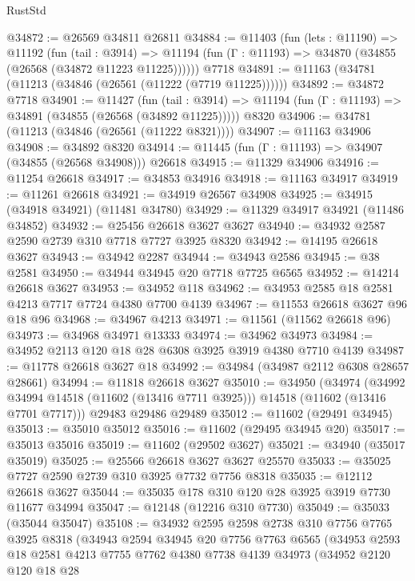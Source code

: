\begin{lexlean}{RustStd}
\begin{coremodule}
@34872 := @26569 @34811 @26811
@34884 := @11403
    (fun (lets : @11190) =>
    @11192
      (fun (tail : @3914) =>
      @11194 (fun (Γ : @11193) => @34870 (@34855 (@26568 (@34872 @11223 @11225))))))
    @7718
@34891 := @11163 (@34781 (@11213 (@34846 (@26561 (@11222 (@7719 @11225))))))
@34892 := @34872 @7718
@34901 := @11427
    (fun (tail : @3914) => @11194 (fun (Γ : @11193) => @34891 (@34855 (@26568 (@34892 @11225)))))
    @8320
@34906 := @34781 (@11213 (@34846 (@26561 (@11222 @8321))))
@34907 := @11163 @34906
@34908 := @34892 @8320
@34914 := @11445 (fun (Γ : @11193) => @34907 (@34855 (@26568 @34908))) @26618
@34915 := @11329 @34906
@34916 := @11254 @26618
@34917 := @34853 @34916
@34918 := @11163 @34917
@34919 := @11261 @26618
@34921 := @34919 @26567 @34908
@34925 := @34915 (@34918 @34921) (@11481 @34780)
@34929 := @11329 @34917 @34921 (@11486 @34852)
@34932 := @25456 @26618 @3627 @3627
@34940 := @34932 @2587 @2590 @2739 @310 @7718 @7727 @3925 @8320
@34942 := @14195 @26618 @3627
@34943 := @34942 @2287
@34944 := @34943 @2586
@34945 := @38 @2581
@34950 := @34944 @34945 @20 @7718 @7725 @6565
@34952 := @14214 @26618 @3627
@34953 := @34952 @118
@34962 := @34953 @2585 @18 @2581 @4213 @7717 @7724 @4380 @7700 @4139
@34967 := @11553 @26618 @3627 @96 @18 @96
@34968 := @34967 @4213
@34971 := @11561 (@11562 @26618 @96)
@34973 := @34968 @34971 @13333
@34974 := @34962 @34973
@34984 := @34952 @2113 @120 @18 @28 @6308 @3925 @3919 @4380 @7710 @4139
@34987 := @11778 @26618 @3627 @18
@34992 := @34984 (@34987 @2112 @6308 @28657 @28661)
@34994 := @11818 @26618 @3627
@35010 := @34950
    (@34974
      (@34992 @34994 @14518 (@11602 (@13416 @7711 @3925)))
      @14518
      (@11602 (@13416 @7701 @7717)))
    @29483
    @29486
    @29489
@35012 := @11602 (@29491 @34945)
@35013 := @35010 @35012
@35016 := @11602 (@29495 @34945 @20)
@35017 := @35013 @35016
@35019 := @11602 (@29502 @3627)
@35021 := @34940 (@35017 @35019)
@35025 := @25566 @26618 @3627 @3627 @25570
@35033 := @35025 @7727 @2590 @2739 @310 @3925 @7732 @7756 @8318
@35035 := @12112 @26618 @3627
@35044 := @35035 @178 @310 @120 @28 @3925 @3919 @7730 @11677 @34994
@35047 := @12148 (@12216 @310 @7730)
@35049 := @35033 (@35044 @35047)
@35108 := @34932
    @2595
    @2598
    @2738
    @310
    @7756
    @7765
    @3925
    @8318
    (@34943
      @2594
      @34945
      @20
      @7756
      @7763
      @6565
      (@34953
        @2593
        @18
        @2581
        @4213
        @7755
        @7762
        @4380
        @7738
        @4139
        @34973
        (@34952
          @2120
          @120
          @18
          @28

\end{coremodule}
\end{lexlean}
